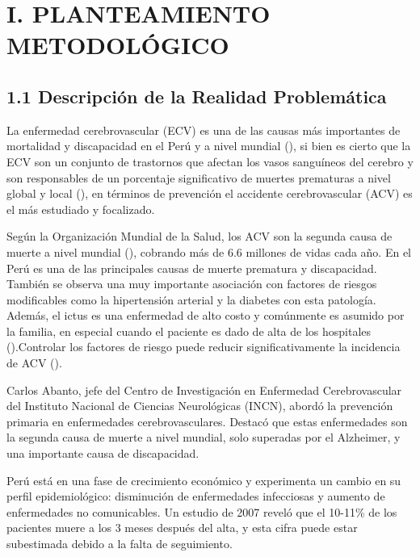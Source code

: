 \section{I. PLANTEAMIENTO METODOLÓGICO} \label{cap:CAPI}

\subsection{1.1 Descripción de la Realidad Problemática}

La enfermedad cerebrovascular (ECV) es una de las causas más importantes de mortalidad y discapacidad en el Perú y a nivel mundial (\cite{MALAGA2018}), si bien es cierto que la ECV son un conjunto de trastornos que afectan los vasos sanguíneos del cerebro y son responsables de un porcentaje significativo de muertes prematuras  a nivel global y local (\cite{bernaberevista}), en términos de prevención el accidente cerebrovascular (ACV) es el más estudiado y focalizado.
\newline

Según la Organización Mundial de la Salud, los ACV son la segunda causa de muerte a nivel mundial (\cite{incn2022}), cobrando más de 6.6 millones de vidas cada año. En el Perú es una de las principales causas de muerte prematura y discapacidad. También se observa una muy importante asociación con factores de riesgos modificables como la hipertensión arterial y la diabetes con esta patología. Además, el ictus es una enfermedad de alto costo y comúnmente es asumido por la familia, en especial cuando el paciente es dado de alta de los hospitales (\cite{incn2024}).Controlar los factores de riesgo puede reducir significativamente la incidencia de ACV (\cite{acv_s_f}).
\newline

Carlos Abanto, jefe del Centro de Investigación en Enfermedad Cerebrovascular del Instituto Nacional de Ciencias Neurológicas (INCN), abordó la prevención primaria en enfermedades cerebrovasculares. Destacó que estas enfermedades son la segunda causa de muerte a nivel mundial, solo superadas por el Alzheimer, y una importante causa de discapacidad.
\newline


Perú está en una fase de crecimiento económico y experimenta un cambio en su perfil epidemiológico: disminución de enfermedades infecciosas y aumento de enfermedades no comunicables. Un estudio de 2007 reveló que el 10-11\% de los pacientes muere a los 3 meses después del alta, y esta cifra puede estar subestimada debido a la falta de seguimiento.
\newline


